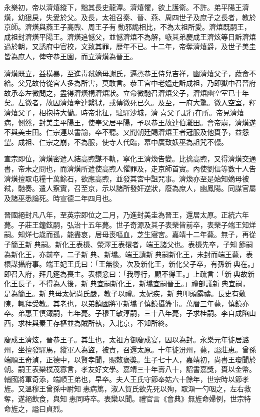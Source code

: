 永樂初，帝以濟熺縱下，黜其長史龍潭。濟熺懼，欲上護衛。不許。弟平陽王濟熿，幼狠戾，失愛於父。及長，太祖召秦、晉、燕、周四世子及庶子之長者，教於京師。濟熿與燕王子高煦、周王子有動邪詭相比，不為太祖所愛。濟熺既嗣王，成祖封濟熿平陽王。濟熿追憾父，並憾濟熺不為解，嗾其弟慶成王濟炫等日訴濟熺過於朝，又誘府中官校，文致其罪，歷年不已。十二年，帝奪濟熺爵，及世子美圭皆為庶人，俾守恭王園，而立濟熿為晉王。

濟熿既立，益橫暴，至進毒弒嫡母謝氏，逼烝恭王侍兒吉祥，幽濟熺父子，蔬食不給。父兄故侍從宮人多為所害，莫敢言。恭王宮中老媼走訴成祖，乃即獄中召晉府故承奉左微問之，盡得濟熿構濟熺狀。立命微馳召濟熺父子，濟熺幽空室已十年矣。左微者，故因濟熺牽連繫獄，或傳微死已久。及至，一府大驚。微入空室，釋濟熺父子，相抱持大慟。時帝北征，駐驛沙城，濟喜父子謁行在所。帝見濟熺病，惻然，封美圭平陽王，使奉父居平陽，予以恭王故連伯灘田。會帝崩，濟熿遂不與美圭田。仁宗連以書諭，卒不聽。又聞朝廷賜濟熺王者冠服及他賚予，益怨望。成祖、仁宗之崩，不為服，使寺人代臨，幕中廣致妖巫為詛咒不輟。

宣宗即位，濟熿密遣人結高煦謀不軌，寧化王濟煥告變。比擒高煦，又得濟熿交通書，帝未之問也，而濟熿所遣使高煦人懼罪及，走京師首實。內使劉信等數十人告濟熿擅取屯糧十萬餘石，欲應高煦，並發其宮中詛咒事。濟煥亦至是始知嫡母被弒，馳奏。遣人察實，召至京，示以諸所發奸逆狀，廢為庶人，幽鳳陽。同謀官屬及諸巫悉論死。時宣德二年四月也。

晉國絕封凡八年，至英宗即位之二月，乃進封美圭為晉王，還居太原。正統六年薨。子莊王鐘鉉嗣，弘治十五年薨。世子奇源及其子表榮皆前卒，表榮子端王知烊嗣。知烊七歲而孤，能盡哀，居母喪嘔血，芝生寢宮。嘉靖十二年薨。無子，再從子簡王新典嗣。新化王表槏、滎澤王表檈者，端王諸父也。表槏先卒，子知節嗣為新化王，亦前卒，二子新典、新墧。端王請新典嗣新化王，未封而端王薨，表檈謀攝府事。端王妃王氏曰：「王無後，次及新化王，新化父子卒，有孫新典在。」即召入府，拜几筵為喪主。表檈忿曰：「我尊行，顧不得王。」上疏言：「新典故新化王長子，不得為人後，新典宜嗣新化王，新墧宜嗣晉王。」禮部議新典宜嗣，是為簡王。新典母太妃尚氏嚴，教子以禮。太妃疾，新典叩頭露禱。長史有敷陳，輒拜受教。其老也，以弟鎮國將軍新墧子慎鏡攝籓事。萬曆三年薨，慎鏡亦卒。弟惠王慎鋷嗣，七年薨。子穆王敏淳嗣，三十八年薨，子求桂嗣。李自成陷山西，求桂與秦王存樞並為賊所執，入北京，不知所終。

慶成王濟炫，晉恭王子。其生也，太祖方御慶成宴，因以為封。永樂元年徙居潞州，坐擅發驛馬，縱軍人為盜，被責，召還太原。十年徙汾州，薨，謚莊惠。曾孫端順王奇湞，正德中，以賢孝聞，賜敕褒獎。生子七十人，嘉靖初，尚書王瓊聞於朝。嗣王表欒樸茂寡言，孝友好文學。嘉靖三十年壽八十，詔書嘉獎，賚以金幣。輔國將軍奇添，端順王弟也，早卒。夫人王氏守節奉姑六十餘年，世宗時以節孝旌。又溫穆王曾孫中尉知恚病篤，淑人賀氏欲先死以殉，取澒一勺咽之，左右救奪，遂絕飲食，與知恚同時卒。表欒以聞。禮官言《會典》無旌命婦例，世宗特命旌之，謚曰貞烈。

